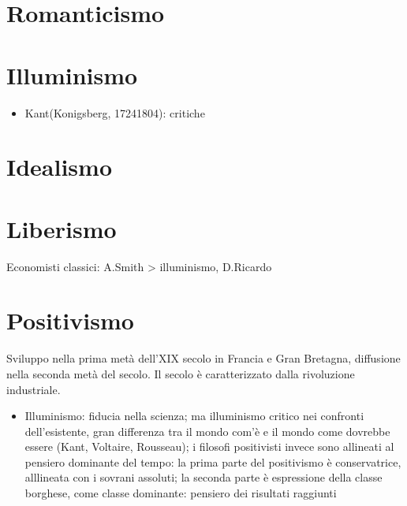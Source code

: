 \documentclass[letterpaper,10pt,italian]{jupyterBook}
\begin{document}
\section{Romanticismo}
\label{\detokenize{ch/history:romanticismo}}

\section{Illuminismo}
\label{\detokenize{ch/history:illuminismo}}\label{\detokenize{ch/history:pc-illuminism}}
\sphinxAtStartPar
{}
\begin{itemize}
\item {} 
\sphinxAtStartPar
Kant(Konigsberg, 1724\sphinxhyphen{}1804): critiche

\end{itemize}


\section{Idealismo}
\label{\detokenize{ch/history:pc-idealism}}\label{\detokenize{ch/history:idealismo}}

\section{Liberismo}
\label{\detokenize{ch/history:liberismo}}\label{\detokenize{ch/history:pc-liberism}}
\sphinxAtStartPar
Economisti classici: A.Smith \sphinxhyphen{}> illuminismo, D.Ricardo


\section{Positivismo}
\label{\detokenize{ch/history:positivismo}}\label{\detokenize{ch/history:pc-positivism}}
\sphinxAtStartPar
{} Sviluppo nella prima metà dell’XIX secolo in Francia e Gran Bretagna, diffusione nella seconda metà del secolo. Il secolo è caratterizzato dalla rivoluzione industriale.

\sphinxAtStartPar
{}
\begin{itemize}
\item {} 
\sphinxAtStartPar
Illuminismo: fiducia nella scienza; ma illuminismo critico nei confronti dell’esistente, gran differenza tra il mondo com’è e il mondo come dovrebbe essere (Kant, Voltaire, Rousseau); i filosofi positivisti invece sono allineati al pensiero dominante del tempo: la prima parte del positivismo è conservatrice, alllineata con i sovrani assoluti; la seconda parte è espressione della classe borghese, come classe dominante: pensiero dei risultati raggiunti

\end{itemize}
\end{document}
